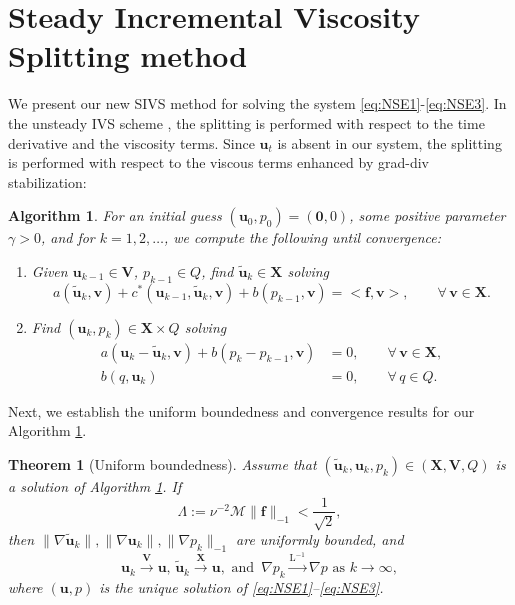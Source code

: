 \documentclass[3p]{elsarticle}
\newtheorem{theorem}{Theorem}
\newtheorem{algorithm}{Algorithm}[section]
\def\V#1{\mathbf{#1}}
\def\Vt#1{\mathbf{\tilde{#1}}}
\newcommand{\Mbd}{\mathcal{M}}
\newcommand{\Linvmap}{\mathrm{L^{-1}}}
\newcommand{\DY}[1]{{\color{black}{#1}}}
\begin{document}
\section{Steady Incremental Viscosity Splitting method}\label{Sec-Algo}
We present our new SIVS method for solving the system \eqref{eq:NSE1}-\eqref{eq:NSE3}.  In the unsteady IVS scheme \cite{Yak2023}, the splitting is performed with respect to the time derivative and the viscosity terms. Since $\V{u}_t$ is absent in our system, the splitting is performed with respect to the viscous terms enhanced by grad-div stabilization:
\begin{algorithm} \label{algo1}
For an initial guess $(\V{u}_0,p_0) = (\V{0},0)$, 
some positive parameter $\gamma>0$, 
and for $k = 1, 2, \ldots $, we compute the following until convergence: 
\begin{enumerate}
\item[{\bf Step 1:}] Given $\V{u}_{k-1} \in \V{V}$,  $p_{k-1} \in Q$, find $ \V{\tilde{u}}_{k} \in \V{X}$ solving
\begin{equation}\label{Iter-Split1}
a(\V{\tilde{u}}_{k},\V{v})
+ c^*(\V{u}_{k-1}, \V{\tilde{u}}_{k}, \V{v}) + b(p_{k-1},\V{v}) = <\V{f},\V{v} >,
\qquad \forall \, \V{v} \in \V{X}.
\end{equation}
\item[{\bf Step 2:}] Find $(\V{u}_{k}, p_{k}) \in \V{X} \times Q$ 
solving
\begin{equation}\label{Iter-Split2}
\begin{aligned}
a(\V{u}_{k} - \V{\tilde{u}}_{k}, \V{v}) + b(p_k-p_{k-1},\V{v}) & = 0, \qquad \forall \, \V{v} \in \V{X}, \\
b(q, \V{u}_{k}) & = 0, \qquad \forall \, q \in Q.
\end{aligned}
\end{equation}
\end{enumerate}
\end{algorithm}
Next, we establish the uniform boundedness and convergence results for our Algorithm \ref{algo1}.
\begin{theorem}[Uniform boundedness]\label{boundedness}
Assume that $(\Vt{u}_k, \V{u}_k, p_k) \in  (\V{X},\V{V},Q) $ is a solution of Algorithm \ref{algo1}. If 
%
\begin{equation}
	\Lambda := \nu^{-2} \Mbd \|\V{f}\|_{-1} < \frac{1}{\sqrt{2}} \label{eq:smalldata},    
\end{equation}
%
%
then $\| \nabla \Vt{u}_k\|, \| \nabla \V{u}_k\| , \| \nabla p_k\|_{-1}$ are uniformly bounded, and $$\displaystyle \V{u}_k \xrightarrow{\V{V}} \V{u}, \, \Vt{u}_k \xrightarrow{\V{X}} \V{u}, \text{ and } \, \nabla p_k \xrightarrow{\Linvmap} \nabla p \text{ as } k \rightarrow \infty,$$
where $(\V{u},p) $ is the unique solution of  \eqref{eq:NSE1}--\eqref{eq:NSE3}.
\end{theorem} 
\end{document}
